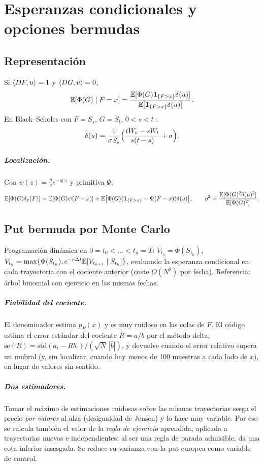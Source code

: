 \chapter{Esperanzas condicionales y opciones bermudas}

\section{Representación }
Si $\langle D F, u \rangle=1$ y $\langle D G, u \rangle=0$,
\[
  \mathbb{E}[\Phi(G)\mid F=x]=\frac{\mathbb{E}[\Phi(G)\mathbf{1}_{\{F>x\}}\delta(u)]}{\mathbb{E}[\mathbf{1}_{\{F>x\}}\delta(u)]}.
\]
En Black--Scholes con $F=S_s$, $G=S_t$, $0<s<t$ :
\[
  \delta(u)=\frac{1}{\sigma S_s}\Big(\frac{tW_s-sW_t}{s(t-s)}+\sigma\Big).
\]

\paragraph{Localización.} Con $\psi(z)=\tfrac\eta2e^{-\eta|z|}$ y primitiva $\Psi$,
\[
  \mathbb{E}[\Phi(G)\delta_x(F)]=\mathbb{E}[\Phi(G)\psi(F-x)]+\mathbb{E}\big[\Phi(G)(\mathbf{1}_{\{F>x\}}-\Psi(F-x))\delta(u)\big],
  \qquad \eta^2=\frac{\mathbb{E}[\Phi(G)^2\delta(u)^2]}{\mathbb{E}[\Phi(G)^2]}.
\]

\section{Put bermuda por Monte Carlo }
Programación dinámica en $0=t_0<\dots<t_n=T$:
$V_{t_n}=\Phi(S_{t_n})$, $V_{t_k}=\max\{\Phi(S_{t_k}),e^{-r\Delta t}\mathbb{E}[V_{t_{k+1}}\mid S_{t_k}]\}$,
evaluando la esperanza condicional en cada trayectoria con el cociente anterior
(coste $O(N^2)$ por fecha). Referencia: árbol binomial con ejercicio en las mismas fechas.

\paragraph{Fiabilidad del cociente.} El denominador estima $p_F(x)$ y es muy ruidoso en las colas
de $F$. El código estima el error estándar del cociente $R=\bar a/\bar b$ por el método delta,
$\mathrm{se}(R)=\mathrm{std}(a_i-Rb_i)/(\sqrt N\,|\bar b|)$, y devuelve  cuando el error
relativo supera un umbral (y, sin localizar, cuando hay menos de 100 muestras a cada lado de $x$),
en lugar de valores sin sentido.

\paragraph{Dos estimadores.} Tomar el máximo de estimaciones ruidosas sobre las mismas trayectorias
sesga el precio \emph{por valores} al alza (desigualdad de Jensen) y lo hace muy variable. Por eso se
calcula también el valor de la \emph{regla de ejercicio} aprendida, aplicada a trayectorias nuevas e
independientes: al ser una regla de parada admisible, da una cota inferior insesgada. Se reduce su
varianza con la put europea como variable de control.

